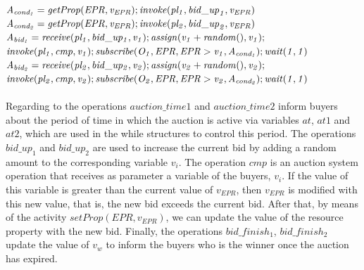 % 
${\it A_{cond_{1}}=getProp(EPR,v_{EPR});
		invoke(pl_1,{bid\_up}_1,v_{EPR})}$\\
%
${\it A_{cond_{2}}=getProp(EPR,v_{EPR});
		invoke(pl_2,{bid\_up}_2,v_{EPR})}$\\
%
${\it A_{bid_{1}}= receive(pl_1,bid\_up_1,v_1);
		assign(v_1+random(),v_1);
		}$ \\\indent \hspace{0.55cm} ${\it
		invoke(pl_1,cmp,v_1);
		subscribe(O_1,EPR,EPR>v_1,A_{cond_{1}});
		wait(1,1)}$\\
%
${\it A_{bid_{2}}= receive(pl_2,bid\_up_2,v_2);
		assign(v_2+random(),v_2);
		}$ \\\indent \hspace{0.55cm} ${\it
		invoke(pl_2,cmp,v_2);
		subscribe(O_2,EPR,EPR>v_2,A_{cond_{2}});
		wait(1,1)}$\\
\\
Regarding to the operations $auction\_time1$ and $auction\_time2$ inform buyers about the period of time in which the auction is active via variables $at$, $at1$ and $at2$, which are used in the while structures to control this period. The operations $bid\_up_{1}$ and $bid\_up_{2}$ are used to increase the current bid by adding a random amount to the corresponding variable $v_i$. The operation $cmp$ is an auction system operation that receives as parameter a variable of the buyers, $v_i$. If the value of this variable is greater than the current value of $v_{EPR}$, then $v_{EPR}$ is modified with this new value, that is, the new bid exceeds the current bid. After that, by means of the activity $setProp(EPR,v_{EPR})$, we can update the value of the resource property with the new bid. Finally, the operations $bid\_finish_{1}$, $bid\_finish_{2}$ update the value of $v_w$ to inform the buyers who is the winner once the auction has expired. 



